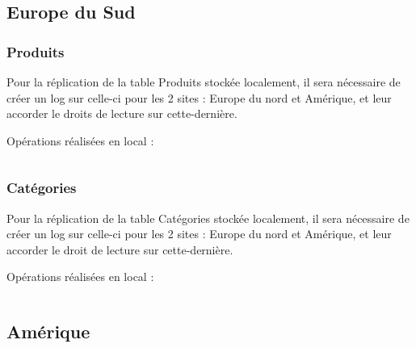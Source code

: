 \documentclass[10pt,a4paper]{article}
\theoremstyle{plain}
\begin{document}
\subsection{Europe du Sud}
\subsubsection{Produits}
Pour la réplication de la table Produits stockée localement, il sera nécessaire de créer un log sur celle-ci pour les 2 sites : Europe du nord et Amérique, et leur accorder le droits de lecture sur cette-dernière.

Opérations réalisées en local :
\inputminted{sql}{EUS_VI-1.sql}

\subsubsection{Catégories}
Pour la réplication de la table Catégories stockée localement, il sera nécessaire de créer un log sur celle-ci pour les 2 sites : Europe du nord et Amérique, et leur accorder le droit de lecture sur cette-dernière.

Opérations réalisées en local :
\inputminted{sql}{EUS_VI-2.sql}
\newpage

\subsection{Amérique}
\end{document}
